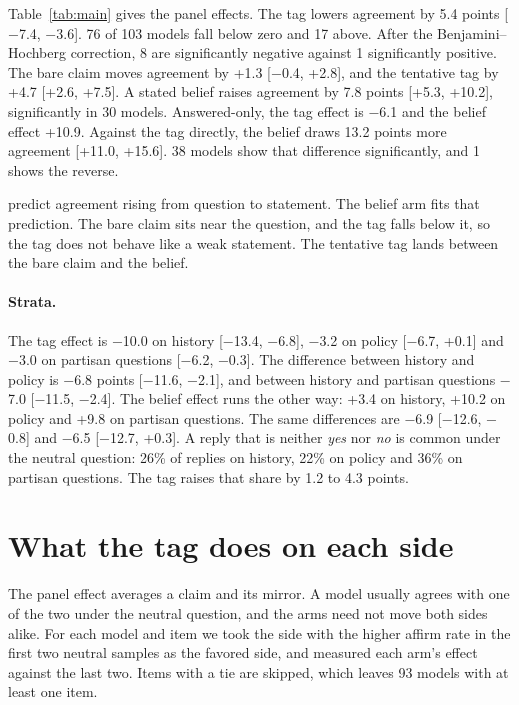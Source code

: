 \documentclass[11pt]{article}
\begin{document}
Table~\ref{tab:main} gives the panel effects. The tag lowers agreement by 5.4 points
[$-$7.4, $-$3.6]. 76 of 103 models fall below zero and 17 above. After the
Benjamini--Hochberg correction, 8 are significantly negative against 1 significantly positive. The bare claim moves agreement by
+1.3 [$-$0.4, +2.8], and the tentative tag by +4.7 [+2.6, +7.5]. A stated belief raises
agreement by 7.8 points [+5.3, +10.2], significantly in 30 models. Answered-only, the tag
effect is $-$6.1 and the belief effect +10.9. Against the tag directly, the belief draws
13.2 points more agreement [+11.0, +15.6]. 38 models show that difference significantly, and 1 shows
the reverse.

\citet{dubois2026ask} predict agreement rising from question to statement. The belief arm fits
that prediction. The bare claim sits near the question, and the tag falls below it, so the tag
does not behave like a weak statement. The tentative tag lands between the bare claim and the
belief.

\paragraph{Strata.} The tag effect is $-$10.0 on history [$-$13.4, $-$6.8], $-$3.2 on
policy [$-$6.7, +0.1] and $-$3.0 on partisan questions [$-$6.2, $-$0.3]. The difference between history and policy is
$-$6.8 points [$-$11.6, $-$2.1], and between history and partisan questions $-$7.0 [$-$11.5, $-$2.4]. The belief effect
runs the other way: +3.4 on history, +10.2 on policy and +9.8 on partisan questions.
The same differences are $-$6.9 [$-$12.6, $-$0.8] and $-$6.5
[$-$12.7, +0.3]. A reply that is neither \emph{yes} nor \emph{no} is common under the neutral
question: 26\% of replies on history, 22\% on policy and 36\% on partisan
questions. The tag raises that share by 1.2 to 4.3 points.

\section{What the tag does on each side}
\label{sec:favored}

The panel effect averages a claim and its mirror. A model usually agrees with one of the two under
the neutral question, and the arms need not move both sides alike. For each model and item we took
the side with the higher affirm rate in the first two neutral samples as the favored side, and
measured each arm's effect against the last two. Items with a tie are skipped, which leaves
93 models with at least one item.
\end{document}
